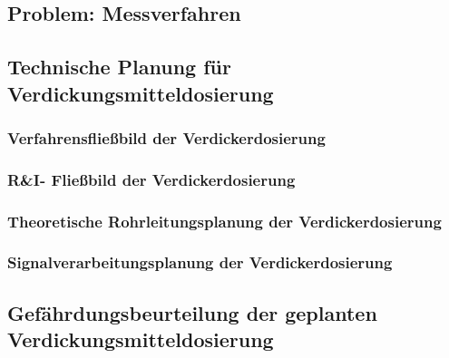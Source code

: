 \subsection{Problem: Messverfahren}

\subsection{Technische Planung für Verdickungsmitteldosierung}
\subsubsection{Verfahrensfließbild der Verdickerdosierung}
\subsubsection{R\&I- Fließbild der Verdickerdosierung}
\subsubsection{Theoretische Rohrleitungsplanung der Verdickerdosierung}

\subsubsection{Signalverarbeitungsplanung der Verdickerdosierung}

\subsection{Gefährdungsbeurteilung der geplanten Verdickungsmitteldosierung}


